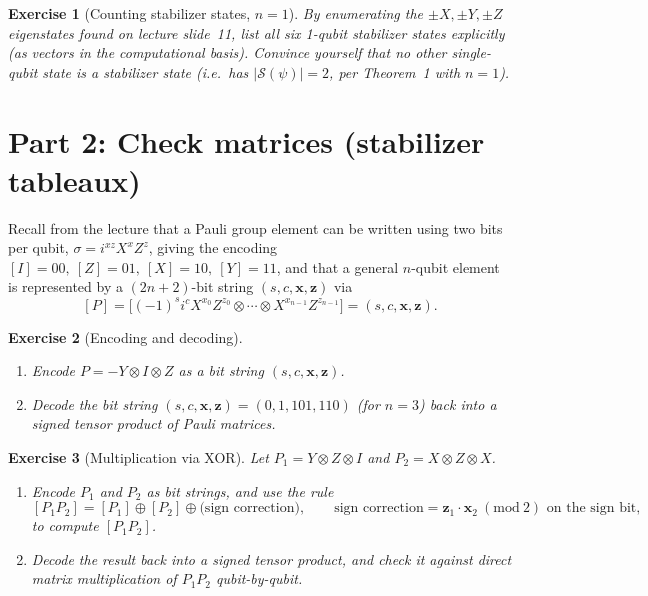 \documentclass[11pt]{article}
\newtheorem*{exercise}{Exercise}
\newcommand{\Sop}{\mathcal{S}}
\begin{document}
\begin{exercise}[Counting stabilizer states, $n=1$]
By enumerating the $\pm X, \pm Y, \pm Z$ eigenstates found on lecture
slide~11, list all six 1-qubit stabilizer states explicitly (as vectors in
the computational basis). Convince yourself that no other single-qubit
state is a stabilizer state (i.e.\ has $|\Sop(\psi)|=2$, per Theorem~1 with
$n=1$).
\end{exercise}

\bigskip
\section*{Part 2: Check matrices (stabilizer tableaux)}

Recall from the lecture that a Pauli group element can be written using two
bits per qubit, $\sigma = i^{x z} X^x Z^z$, giving the encoding
$[I]=00,\ [Z]=01,\ [X]=10,\ [Y]=11$, and that a general $n$-qubit element is
represented by a $(2n+2)$-bit string $(s,c,\mathbf{x},\mathbf{z})$ via
\[
    [P] = \big[(-1)^s i^c X^{x_0}Z^{z_0}\otimes \cdots \otimes X^{x_{n-1}}Z^{z_{n-1}}\big]
        = (s,c,\mathbf{x},\mathbf{z}).
\]

\begin{exercise}[Encoding and decoding]
\begin{enumerate}[label=(\alph*)]
    \item Encode $P = -Y \otimes I \otimes Z$ as a bit string
    $(s,c,\mathbf{x},\mathbf{z})$.
    \item Decode the bit string $(s,c,\mathbf x,\mathbf z) = (0,1,101,110)$
    (for $n=3$) back into a signed tensor product of Pauli matrices.
\end{enumerate}
\end{exercise}

\begin{exercise}[Multiplication via XOR]
Let $P_1 = Y \otimes Z \otimes I$ and $P_2 = X \otimes Z \otimes X$.
\begin{enumerate}[label=(\alph*)]
    \item Encode $P_1$ and $P_2$ as bit strings, and use the rule
    \[
        [P_1 P_2] = [P_1] \oplus [P_2] \oplus \text{(sign correction)}, \qquad
        \text{sign correction} = \mathbf{z}_1 \cdot \mathbf{x}_2 \ (\mathrm{mod}\ 2)
        \text{ on the sign bit},
    \]
    to compute $[P_1 P_2]$.
    \item Decode the result back into a signed tensor product, and check it
    against direct matrix multiplication of $P_1 P_2$ qubit-by-qubit.
\end{enumerate}
\end{exercise}
\end{document}
